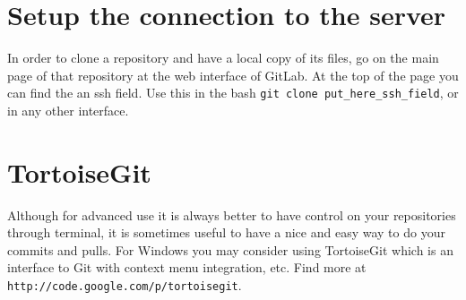 \documentclass[11pt]{article}
\begin{document}
\section{Setup the connection to the server}
\label{sec:clone}
In order to clone a repository and have a local copy of its files, 
go on the main page of that repository at the web interface of GitLab.
At the top of the page you can find the an ssh field. Use this in the 
bash \texttt{git clone put\_here\_ssh\_field}, or in any other interface.

\section{TortoiseGit}
\label{sec:tortoise}
Although for advanced use it is always better to have control on your 
repositories through terminal, it is sometimes useful to have a nice 
and easy way to do your commits and pulls. For Windows you may consider 
using TortoiseGit which is an interface to Git with context menu integration, etc. 
Find more at \texttt{http://code.google.com/p/tortoisegit}.
\end{document}
